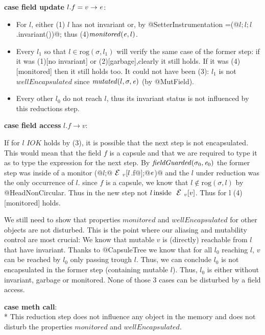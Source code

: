 \noindent\textbf{case field update} $l.f=v\rightarrow {\ensuremath{\mathit{e}}}$:
  \begin{itemize}
  \item For $l$, either (1) $l$ has not invariant or, by @SetterInstrumentation 
  \e=\Q@M(@$l;l;l$\Q@.invariant())@;
  thus (4)$\mathit{monitored}({\mathit{e}},l)$.
  \item Every $l_1$ so that $l\in \text{rog}(\sigma,l_1)$ will verify the same case
  of the former step:
  if it was (1)[no invariant] or (2)[garbage],clearly it still holds.
  If it was (4)[monitored] then it still holds too.
  It could not have been (3): $l_1$ is not $\mathit{wellEncapsulated}$ since 
$\mathit{mutated}(l,	\sigma,\e)$ (by @MutField).
  \item Every other $l_0$ do not reach $l$, thus its invariant status is not influenced by this reductions step.
\end{itemize}

\noindent\textbf{case field access} $l.f\rightarrow v$:

    If for $l$ $IOK$ holds by (3),  
    it is possible that the next step is not encapsulated.
    This would mean that the field $f$ is a capsule and that we are required
to type it as \Q@mut@ to type the expression for the next step.
By $\mathit{fieldGuarded}(\sigma_0,\e_0)$
    the former step was inside of a monitor \Q@M(@$l$\Q@;@$\ctx_v[l$\Q@.f@$]$\Q@;@${\mathit{e}}$\Q@)@
    and the $l$ under reduction was the only occurrence of $l$.
    since $f$ is a capsule, we know that $l\notin \text{rog}(\sigma,l)$
    by @HeadNonCircular.
    Thus in the new step not $l\, \text{inside}\ \ctx_v[v]$.
    Thus for l (4)[monitored] holds.
    
We still need to show that properties $\mathit{monitored}$ and $\mathit{wellEncapsulated}$
 for other objects are
not disturbed. This is the point where our aliasing and mutability control are most crucial:
We know that mutable $v$ is (directly) reachable from
$l$ that have invariant.
Thanks to @CapsuleTree we know that for all $l_0$ reaching $l$,
$v$ can be reached by $l_0$ only passing trough $l$.
Thus, we can conclude  $l_0$ is not encapsulated in the former step (containing mutable $l$).
Thus, $l_0$ is either without invariant, garbage or monitored.
None of those 3 cases can be disturbed by a field access.


\noindent\textbf{case meth call}:\\*
  This reduction step does not influence any object in the memory and does not
disturb the properties $\mathit{monitored}$ and $\mathit{wellEncapsulated}$.

